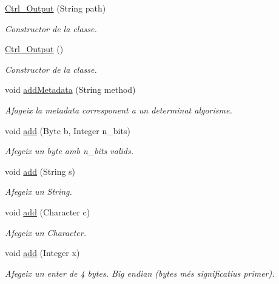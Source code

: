 \begin{DoxyCompactItemize}
\item 
\hyperlink{classpersistencia_1_1output_1_1Ctrl__Output_ab8a70c7d09789826249d8556ce3531f6}{Ctrl\+\_\+\+Output} (String path)
\begin{DoxyCompactList}\small\item\em Constructor de la classe. \end{DoxyCompactList}\item 
\hyperlink{classpersistencia_1_1output_1_1Ctrl__Output_a8f5bf9038ef97c01d13acd211985cd7a}{Ctrl\+\_\+\+Output} ()
\begin{DoxyCompactList}\small\item\em Constructor de la classe. \end{DoxyCompactList}\item 
void \hyperlink{classpersistencia_1_1output_1_1Ctrl__Output_ae6d6857910a023982900ddc857b891f0}{add\+Metadata} (String method)
\begin{DoxyCompactList}\small\item\em Afageix la metadata corresponent a un determinat algorisme. \end{DoxyCompactList}\item 
void \hyperlink{classpersistencia_1_1output_1_1Ctrl__Output_a8c5aa5a6acb5259faeb1c05c71ddd21c}{add} (Byte b, Integer n\+\_\+bits)
\begin{DoxyCompactList}\small\item\em Afegeix un byte amb n\+\_\+bits valids. \end{DoxyCompactList}\item 
void \hyperlink{classpersistencia_1_1output_1_1Ctrl__Output_a0e3bedb0b88d0e60b228cc49143e6f0e}{add} (String s)
\begin{DoxyCompactList}\small\item\em Afegeix un String. \end{DoxyCompactList}\item 
void \hyperlink{classpersistencia_1_1output_1_1Ctrl__Output_a4070b40016edf1d959b3f7c60c90ef10}{add} (Character c)
\begin{DoxyCompactList}\small\item\em Afegeix un Character. \end{DoxyCompactList}\item 
void \hyperlink{classpersistencia_1_1output_1_1Ctrl__Output_aefe249b0ae9dbe578c44d96c6b56cf5d}{add} (Integer x)
\begin{DoxyCompactList}\small\item\em Afegeix un enter de 4 bytes. Big endian (bytes més significatius primer). \end{DoxyCompactList}\item 

\end{DoxyCompactItemize}
